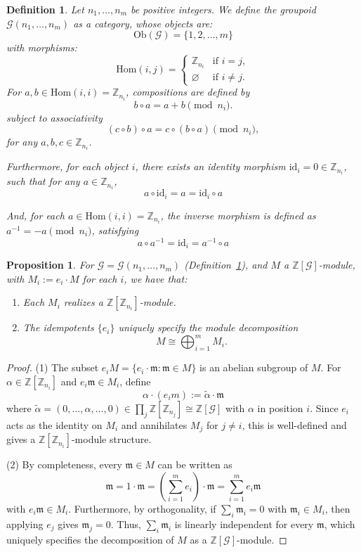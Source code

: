 \documentclass[10pt,a4paper]{amsart}
\newtheorem{definition}{Definition}
\newtheorem{proposition}{Proposition}
\newcommand{\Hom}{\mathrm{Hom}}
\newcommand{\Ob}{\mathrm{Ob}}
\newcommand{\Z}{\mathbb{Z}}
\newcommand{\calG}{\mathcal{G}}
\newcommand{\m}{\mathfrak{m}}
\begin{document}
\begin{definition}
\label{defgcygr}
Let $n_1, \ldots, n_m$ be positive integers. We define the \emph{groupoid}  $\calG(n_1, \ldots, n_m)$ as a category, whose objects are:  
\[ \Ob(\calG) = \{1, 2, \ldots, m\}  \]
with morphisms:  
 \[
          \Hom(i,j) =
          \begin{cases}
            \Z_{n_i} & \text{if } i = j, \\
            \varnothing & \text{if } i \neq j.
          \end{cases}
        \]
  For $a, b \in \Hom(i,i) = \Z_{n_i}$,  compositions are defined by
        \[
          b \circ a = a + b \pmod{n_i}.
        \]
 subject to associativity   
        \[
          (c \circ b) \circ a = c \circ (b \circ a) \pmod{n_i},
        \]
     for any $a, b, c \in \Z_{n_i}$.  
     
Furthermore, for each object $i$, there exists an identity morphism  $\mathrm{id}_i = 0 \in \Z_{n_i}$, such that  for any $a \in \Z_{n_i}$,
        \[
          a \circ \mathrm{id}_i =  a =  \mathrm{id}_i \circ a 
        \]

And,  for each $a \in \Hom(i,i) = \Z_{n_i}$, the inverse morphism is defined as 
        $a^{-1} = -a \pmod{n_i}$,  satisfying 
        \[
          a \circ a^{-1} = \mathrm{id}_i = a^{-1} \circ a
        \]    
\end{definition}

\begin{proposition}    
\label{prop-id}  
For  $\calG = \calG(n_1, \ldots, n_m)$ (Definition~\ref{defgcygr}), and  $M$  a $\Z[\calG]$-module, with   $M_i := e_i \cdot M$ for each  $i$, we have that:  
\begin{enumerate} 
  \item Each $M_i$ realizes a $\Z[\Z_{n_i}]$-module.
  \item The idempotents $\{ e_i \}$ uniquely specify the module decomposition  
        \[
          M \cong \bigoplus_{i=1}^{m} M_i.
        \]         
\end{enumerate}
\end{proposition}

\begin{proof}
(1) The subset $e_i M = \{e_i \cdot \m: \m\in M\}$ is an abelian
subgroup of $M$. For $\alpha \in \Z[\Z_{n_i}]$ and $e_i \m\in M_i$,
define
\[
  \alpha \cdot (e_i m) := \tilde{\alpha} \cdot \m 
\]
where $\tilde{\alpha} = (0, \ldots, \alpha, \ldots, 0) \in
\prod_j \Z[\Z_{n_j}] \cong \Z[\calG]$ with $\alpha$ in position $i$.
Since $e_i$ acts as the identity on $M_i$ and annihilates $M_j$ for
$j \neq i$, this is well-defined and gives a $\Z[\Z_{n_i}]$-module
structure.

(2) By completeness, every $\m \in M$ can be written as
\[
  \m = 1 \cdot \m= \left(\sum_{i=1}^{m} e_i\right) \cdot \m
  = \sum_{i=1}^{m} e_i \m
\]
with $e_i \m \in M_i$. Furthermore, by orthogonality, if $\sum_i \m_i = 0$ with
$\m_i \in M_i$, then applying $e_j$ gives $\m_j = 0$. Thus, $\sum_i \m_i$ is linearly independent for every $\m$, which uniquely specifies the   decomposition of $M$ as a $\Z[\calG]$-module.    
\end{proof}
\end{document}
